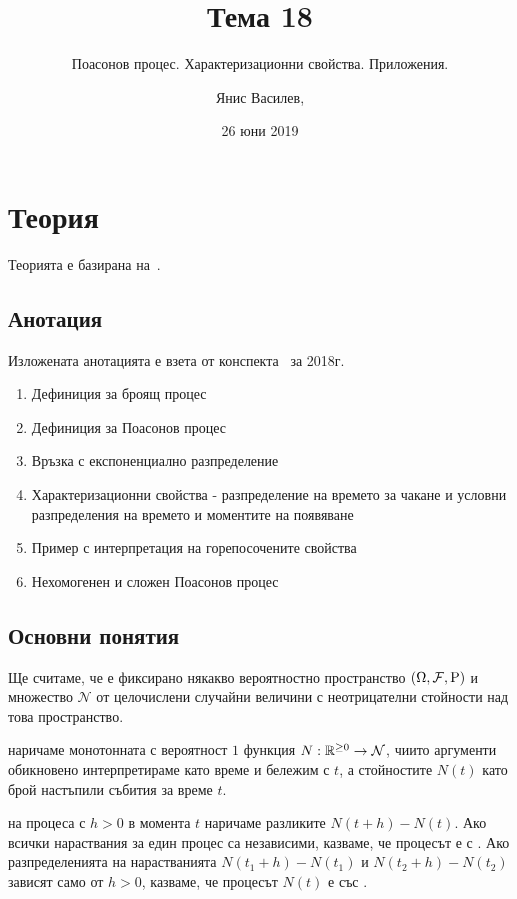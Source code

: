 \documentclass[numbers=endperiod, bibliography=totocnumbered]{scrartcl}
\title{Тема 18}
\subtitle{Поасонов процес. Характеризационни свойства. Приложения.}
\author{Янис Василев, \Email{ianis@ivasilev.net}}
\date{26 юни 2019}
\begin{document}
\maketitle

\section{Теория}

Теорията е базирана на~\cite{Lectures}.

\subsection{Анотация}

Изложената анотацията е взета от конспекта~\cite{Syllabus} за 2018г.

\begin{enumerate}
  \item Дефиниция за броящ процес
  \item Дефиниция за Поасонов процес
  \item Връзка с експоненциално разпределение
  \item Характеризационни свойства - разпределение на времето за чакане и условни разпределения на времето и моментите на появяване
  \item Пример с интерпретация на горепосочените свойства
  \item Нехомогенен и сложен Поасонов процес
\end{enumerate}

\subsection{Основни понятия}

Ще считаме, че е фиксирано някакво вероятностно пространство \( (\Omega, \mathcal{F}, \operatorname{P}) \) и множество \( \mathcal{N} \) от целочислени случайни величини с неотрицателни стойности над това пространство.

\begin{definition}
   наричаме монотонната с вероятност \( 1 \) функция \( N: \mathbb{R}^{\geq 0} \to \mathcal{N} \), чиито аргументи обикновено интерпретираме като време и бележим с \( t \), а стойностите \( N(t) \) като брой настъпили събития за време \( t \).

   на процеса с \( h > 0 \) в момента \( t \) наричаме разликите \( N(t+h) - N(t) \). Ако всички нараствания за един процес са независими, казваме, че процесът е с . Ако разпределенията на нарастванията \( N(t_1+h) - N(t_1) \) и \( N(t_2+h) - N(t_2) \) зависят само от \( h>0 \), казваме, че процесът \( N(t) \) е със .
\end{definition}
\end{document}
